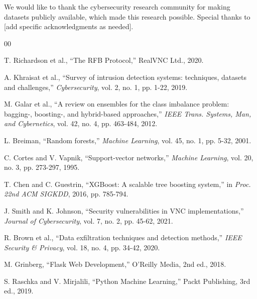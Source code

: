 \documentclass[conference]{IEEEtran}
\begin{document}
We would like to thank the cybersecurity research community for making datasets publicly available, which made this research possible. Special thanks to [add specific acknowledgments as needed].

\begin{thebibliography}{00}

 T. Richardson et al., ``The RFB Protocol,'' RealVNC Ltd., 2020.

 A. Khraisat et al., ``Survey of intrusion detection systems: techniques, datasets and challenges,'' \textit{Cybersecurity}, vol. 2, no. 1, pp. 1-22, 2019.

 M. Galar et al., ``A review on ensembles for the class imbalance problem: bagging-, boosting-, and hybrid-based approaches,'' \textit{IEEE Trans. Systems, Man, and Cybernetics}, vol. 42, no. 4, pp. 463-484, 2012.

 L. Breiman, ``Random forests,'' \textit{Machine Learning}, vol. 45, no. 1, pp. 5-32, 2001.

 C. Cortes and V. Vapnik, ``Support-vector networks,'' \textit{Machine Learning}, vol. 20, no. 3, pp. 273-297, 1995.

 T. Chen and C. Guestrin, ``XGBoost: A scalable tree boosting system,'' in \textit{Proc. 22nd ACM SIGKDD}, 2016, pp. 785-794.

 J. Smith and K. Johnson, ``Security vulnerabilities in VNC implementations,'' \textit{Journal of Cybersecurity}, vol. 7, no. 2, pp. 45-62, 2021.

 R. Brown et al., ``Data exfiltration techniques and detection methods,'' \textit{IEEE Security \& Privacy}, vol. 18, no. 4, pp. 34-42, 2020.

 M. Grinberg, ``Flask Web Development,'' O'Reilly Media, 2nd ed., 2018.

 S. Raschka and V. Mirjalili, ``Python Machine Learning,'' Packt Publishing, 3rd ed., 2019.

\end{thebibliography}
\end{document}
